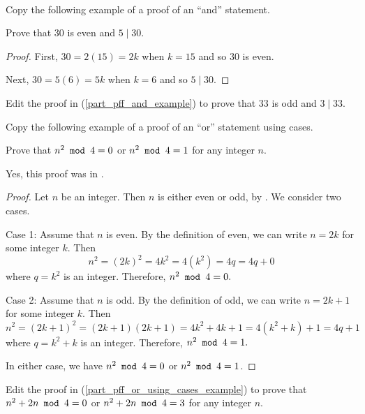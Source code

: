 \begin{act}
\label{act_prove_and_orusingcases}
~
    \begin{actpart}
        \item \label{part_pff_and_example} Copy the following example of a proof of an ``and'' statement.

        Prove that 30 is even and $5 \mid 30$.

        \begin{proof} First, $30 = 2(15)=2k$ when $k=15$ and so 30 is even. 

        Next, $30 = 5(6) = 5k$ when $k=6$ and so $5 \mid 30$.\end{proof}
        
        \item Edit the proof in (\ref{part_pff_and_example}) to prove that 33 is odd and $3 \mid 33$.

        \item \label{part_pff_or_using_cases_example} Copy the following example of a proof of an ``or'' statement using cases.

        Prove that $n^2 \texttt{ mod } 4 = 0$ or $n^2 \texttt{ mod } 4 = 1$ for any integer $n$. 
        
        Yes, this proof was  in .

        \begin{proof}
            Let $n$ be an integer.  Then $n$ is either even or odd, by .  We consider two cases.

            Case 1: Assume that $n$ is even.  By the definition of even, we can write $n = 2k$ for some integer $k$.  Then 
                $$n^2=(2k)^2=4k^2=4(k^2) = 4q=4q+0$$
            where $q=k^2$ is an integer.  Therefore, $n^2 \texttt{ mod } 4 = 0.$

            Case 2: Assume that $n$ is odd.  By the definition of odd, we can write $n = 2k+1$ for some integer $k$.  Then 
                $$n^2=(2k+1)^2 = (2k+1)(2k+1)=4k^2+4k+1 = 4(k^2+k) + 1 = 4q+1$$
            where $q =k^2+k$ is an integer.  Therefore, $n^2 \texttt{ mod } 4 = 1.$

            In either case, we have $n^2 \texttt{ mod } 4 = 0$ or $n^2 \texttt{ mod } 4 = 1$.
        \end{proof}

        \item \label{part_nsqplusn_mod4} Edit the proof in (\ref{part_pff_or_using_cases_example}) to prove that $n^2+2n \texttt{ mod } 4 = 0$ or $n^2+2n \texttt{ mod } 4 = 3$ for any integer $n$.  
    \end{actpart}
\end{act}

